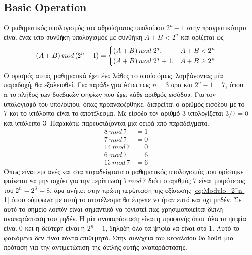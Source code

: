 \subsection{Basic Operation}
Ο μαθηματικός υπολογισμός του αθροίσματος υπολοίπου $2^n-1$ στην πραγματικότητα είναι 
ένας υπο-συνθήκη υπολογισμός με συνθήκη $A+B < 2^n$ και ορίζεται ως 
\begin{equation}
\label{eq:Modulo_2^n-1}
\equationame{Ορισμός άθροισης υπολοίπου $2^n-1$}
(A+B)\, mod\, (2^n-1) = 
\begin{cases}
    (A+B)\, mod\; 2^n       , &  A+B < 2^n\\
    (A+B)\, mod\; 2^n + 1   , & A+B \geq 2^n
\end{cases}
\end{equation}
Ο ορισμός αυτός μαθηματικά έχει ένα λάθος το οποίο όμως, λαμβάνοντας μία 
παραδοχή, θα εξαλειφθεί.
Για παράδειγμα έστω πως $n=3$ άρα και $2^n-1 = 7$, όπου n το πλήθος των δυαδικών ψηφίων
που έχει κάθε αριθμός εισόδου. Για τον υπολογισμό του υπολοίπου, όπως προαναφέρθηκε,
διαιρείται ο αριθμός εισόδου με το 7 και το υπόλοιπο είναι το αποτέλεσμα. Με είσοδο 
τον αριθμό 3 υπολογίζεται $3/7 = 0$ και υπόλοιπο 3. Παρακάτω παρουσιάζονται μια σειρά από 
παραδείγματα.
\begin{equation*}
    \begin{split}
        8\ mod\ 7 &= 1 \\
        7\ mod\ 7 &= 0 \\
        14\ mod\ 7 &= 0 \\
        6\ mod\ 7 &= 6 \\
        13\ mod\ 7 &= 6
    \end{split}
\end{equation*}
Όπως είναι εμφανές και στα παραδείγματα ο μαθηματικός υπολογισμός που ορίστηκε φαίνεται να 
μην ισχύει για την περίπτωση $7\ mod\ 7$ διότι ο αριθμός 7 είναι μικρότερος του $2^n = 2^3 = 8$,
άρα ανήκει στην πρώτη περίπτωση της εξίσωσης \ref{eq:Modulo_2^n-1} όπου σύμφωνα με αυτή το 
αποτέλεσμα θα έπρεπε να ήταν επτά και όχι μηδέν. Σε αυτό το σημείο λοιπόν είναι σημαντικό
να τονιστεί πως χρησιμοποιείται διπλή αναπαράσταση του μηδέν. Η μία αναπαράσταση είναι η 
προφανής όπου όλα τα ψηφία είναι 0 και η δεύτερη είναι η $2^n-1$, δηλαδή όλα τα ψηφία 
να είναι στο 1. Αυτό το φαινόμενο δεν είναι πάντα επιθυμητό. Στην συνέχεια του κεφαλαίου
θα δοθεί μια πρόταση για την αντιμετώπιση της διπλής αυτής αναπαράστασης.

